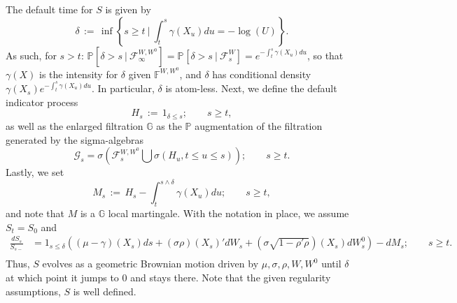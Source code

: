 \documentclass[11pt, letterpaper]{amsart}
\theoremstyle{definition}
\theoremstyle{remark}
\numberwithin{equation}{section}
\newcommand{\such}{\ | \ }
\newcommand{\prob}{\mathbb{P}}
\newcommand{\F}{\mathcal{F}}
\newcommand{\G}{\mathcal{G}}
\newcommand{\filt}{\mathbb{F}}
\newcommand{\filtg}{\mathbb{G}}
\newcommand{\condprobalt}[3]{\prob^{#1}\left[#2\ \big|\ #3\right]}
\newcommand{\dfn}{\, := \,}
\newcommand{\cbra}[1]{\left\{#1\right\}}
\begin{document}
The default time for $S$ is given by
\begin{equation}\label{E:delta}
\delta \dfn \inf\cbra{s\geq t\such \int_t^s \gamma(X_u)du  = -\log\left(U\right)}.
\end{equation}
As such, for $s>t$: $\condprobalt{}{\delta > s}{\F^{W,W^0}_\infty} = \condprobalt{}{\delta >s}{\F^{W}_s} = e^{-\int_t^s \gamma(X_u)du}$, so that $\gamma(X)$ is the intensity for $\delta$ given $\filt^{W,W^0}$, and $\delta$ has conditional density $\gamma(X_s)e^{-\int_t^s \gamma(X_u)du}$. In particular, $\delta$ is atom-less. Next, we define the default indicator process
\begin{equation}\label{E:H_def}
H_s \dfn 1_{\delta \leq s};\qquad s \geq t,
\end{equation}
as well as the enlarged filtration $\filtg$ as the $\prob$ augmentation of the filtration generated by the sigma-algebras
\begin{equation}\label{E:G_def}
\G_s = \sigma\left(\F^{W,W^0}_s \bigcup \sigma(H_u, t\leq u\leq s)\right);\qquad s\geq t.
\end{equation}
Lastly, we set
\begin{equation}\label{E:M_def}
M_s \dfn H_s - \int_t^{s\wedge \delta} \gamma(X_u)du;\qquad s\geq t,
\end{equation}
and note that $M$ is a $\filtg$ local martingale.  With the notation in place, we assume $S_t = S_0$ and
\begin{equation}\label{E:S_def}
\begin{split}
\frac{dS_s}{S_{s-}} &= 1_{s\leq \delta}\left(\left(\mu-\gamma\right)(X_s)ds + \left(\sigma\rho\right)(X_s)'dW_s + \left(\sigma\sqrt{1-\rho'\rho}\right)(X_s)dW^0_s\right) - dM_s;\qquad s\geq t.\\
\end{split}
\end{equation}
Thus, $S$ evolves as a geometric Brownian motion driven by $\mu,\sigma,\rho,W,W^0$  until $\delta$ at which point it jumps to $0$ and stays there.  Note that the given regularity assumptions, $S$ is well defined.
\end{document}
